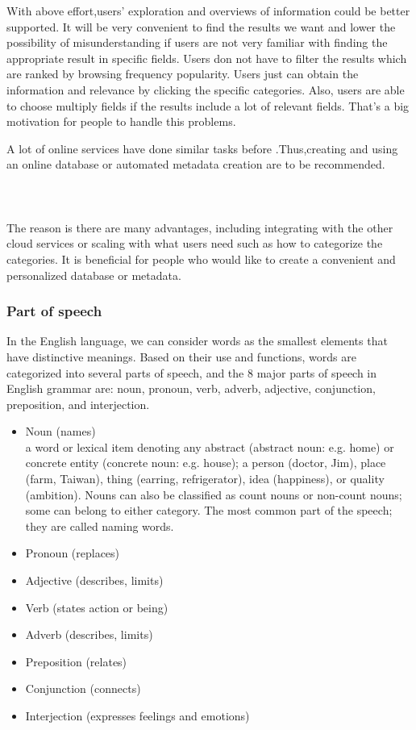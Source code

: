 With above effort,users' exploration and overviews of information could be better supported. It will be very convenient to find the results we want and lower the possibility of misunderstanding if users are not very familiar with finding the appropriate result in specific fields.\cite{TunThuraThet2010} Users don not have to filter the results which are ranked by browsing frequency popularity. Users just can obtain the information and relevance by clicking the specific categories. Also, users are able to choose multiply fields if the results include a lot of relevant fields. That's a big motivation for people to handle this problems. 

A lot of online services have done similar tasks before .Thus,creating and using an online database or automated metadata creation are to be recommended. \\\\\\\\ The reason is there are many advantages, including integrating with the other cloud services or scaling with what users need such as how to categorize the categories. It is beneficial for people who would like to create a convenient and personalized database or metadata.\\

\subsubsection*{Part of speech}

In the English language, we can consider words as the smallest elements that have distinctive meanings. Based on their use and functions, words are categorized into several parts of speech, and the 8 major parts of speech in English grammar are: noun, pronoun, verb, adverb, adjective, conjunction, preposition, and interjection.
\begin{itemize}
	\item Noun (names)\\
	a word or lexical item denoting any abstract (abstract noun: e.g. home) or concrete entity (concrete noun: e.g. house); a person (doctor, Jim), place (farm, Taiwan), thing (earring, refrigerator), idea (happiness), or quality (ambition). Nouns can also be classified as count nouns or non-count nouns; some can belong to either category. The most common part of the speech; they are called naming words.
	\item Pronoun (replaces)
	\item Adjective (describes, limits)
	\item Verb (states action or being)
	\item Adverb (describes, limits)
	\item Preposition (relates)
	\item Conjunction (connects)
	\item Interjection (expresses feelings and emotions)
\end{itemize}

